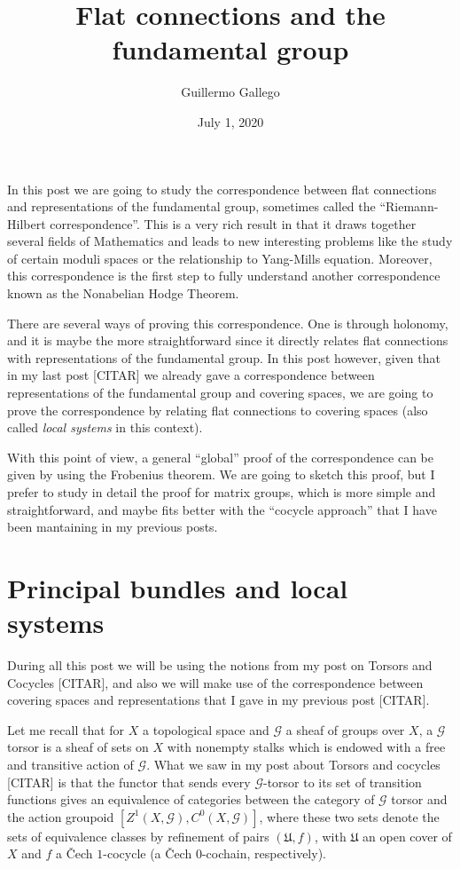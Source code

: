 \documentclass[]{article}
\title{Flat connections and the fundamental group}
\author{Guillermo Gallego}
\date{July 1, 2020}
\begin{document}
\maketitle

In this post we are going to study the correspondence between flat
connections and representations of the fundamental group, sometimes
called the ``Riemann-Hilbert correspondence''. This is a very rich
result in that it draws together several fields of Mathematics and leads
to new interesting problems like the study of certain moduli spaces or
the relationship to Yang-Mills equation. Moreover, this correspondence
is the first step to fully understand another correspondence known as
the Nonabelian Hodge Theorem.

There are several ways of proving this correspondence. One is through
holonomy, and it is maybe the more straightforward since it directly
relates flat connections with representations of the fundamental group.
In this post however, given that in my last post {[}CITAR{]} we already
gave a correspondence between representations of the fundamental group
and covering spaces, we are going to prove the correspondence by
relating flat connections to covering spaces (also called \emph{local
systems} in this context).

With this point of view, a general ``global'' proof of the
correspondence can be given by using the Frobenius theorem. We are going
to sketch this proof, but I prefer to study in detail the proof for
matrix groups, which is more simple and straightforward, and maybe fits
better with the ``cocycle approach'' that I have been mantaining in my
previous posts.

\section{Principal bundles and local
systems}\label{principal-bundles-and-local-systems}

During all this post we will be using the notions from my post on
Torsors and Cocycles {[}CITAR{]}, and also we will make use of the
correspondence between covering spaces and representations that I gave
in my previous post {[}CITAR{]}.

Let me recall that for \(X\) a topological space and \(\mathcal{G}\) a
sheaf of groups over \(X\), a \(\mathcal{G}\) torsor is a sheaf of sets
on \(X\) with nonempty stalks which is endowed with a free and
transitive action of \(\mathcal{G}\). What we saw in my post about
Torsors and cocycles {[}CITAR{]} is that the functor that sends every
\(\mathcal{G}\)-torsor to its set of transition functions gives an
equivalence of categories between the category of \(\mathcal{G}\) torsor
and the action groupoid \([Z^1(X,\mathcal{G}),C^0(X,\mathcal{G})]\),
where these two sets denote the sets of equivalence classes by
refinement of pairs \((\mathfrak{U},f)\), with \(\mathfrak{U}\) an open
cover of \(X\) and \(f\) a Čech \(1\)-cocycle (a Čech \(0\)-cochain,
respectively).
\end{document}

